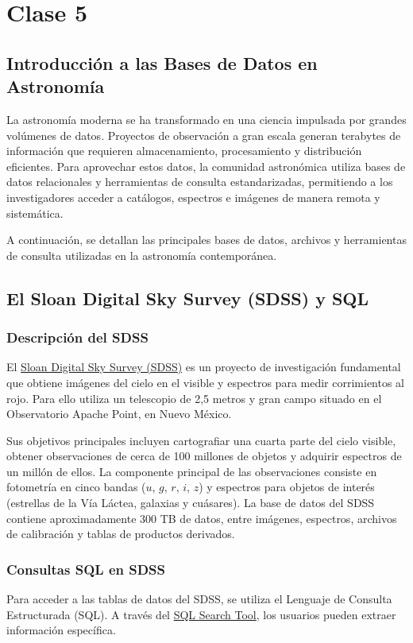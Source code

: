 \chapter{Clase 5}

\section{Introducción a las Bases de Datos en Astronomía}

La astronomía moderna se ha transformado en una ciencia impulsada por grandes volúmenes de datos. Proyectos de observación a gran escala generan terabytes de información que requieren almacenamiento, procesamiento y distribución eficientes. Para aprovechar estos datos, la comunidad astronómica utiliza bases de datos relacionales y herramientas de consulta estandarizadas, permitiendo a los investigadores acceder a catálogos, espectros e imágenes de manera remota y sistemática.

A continuación, se detallan las principales bases de datos, archivos y herramientas de consulta utilizadas en la astronomía contemporánea.

\section{El Sloan Digital Sky Survey (SDSS) y SQL}

\subsection{Descripción del SDSS}
El \href{https://skyserver.sdss.org/dr17/en/home.aspx}{Sloan Digital Sky Survey (SDSS)} es un proyecto de investigación fundamental que obtiene imágenes del cielo en el visible y espectros para medir corrimientos al rojo. Para ello utiliza un telescopio de 2{,}5 metros y gran campo situado en el Observatorio Apache Point, en Nuevo México.

Sus objetivos principales incluyen cartografiar una cuarta parte del cielo visible, obtener observaciones de cerca de 100 millones de objetos y adquirir espectros de un millón de ellos. La componente principal de las observaciones consiste en fotometría en cinco bandas ($u$, $g$, $r$, $i$, $z$) y espectros para objetos de interés (estrellas de la Vía Láctea, galaxias y cuásares). La base de datos del SDSS contiene aproximadamente 300 TB de datos, entre imágenes, espectros, archivos de calibración y tablas de productos derivados.

\subsection{Consultas SQL en SDSS}
Para acceder a las tablas de datos del SDSS, se utiliza el Lenguaje de Consulta Estructurada (SQL). A través del \href{https://skyserver.sdss.org/dr17/SearchTools/sql}{SQL Search Tool}, los usuarios pueden extraer información específica.

